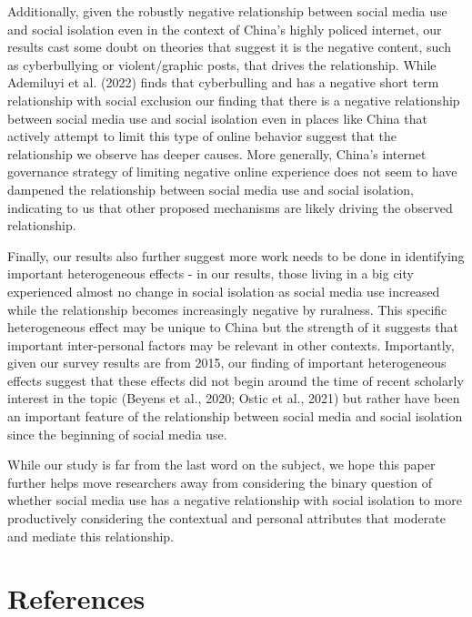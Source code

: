 \documentclass[]{interact}
\theoremstyle{plain}%
\theoremstyle{definition}
\theoremstyle{remark}
\begin{document}
Additionally, given the robustly negative relationship between social
media use and social isolation even in the context of China's highly
policed internet, our results cast some doubt on theories that suggest
it is the negative content, such as cyberbullying or violent/graphic
posts, that drives the relationship. While Ademiluyi et al. (2022) finds
that cyberbulling and has a negative short term relationship with social
exclusion our finding that there is a negative relationship between
social media use and social isolation even in places like China that
actively attempt to limit this type of online behavior suggest that the
relationship we observe has deeper causes. More generally, China's
internet governance strategy of limiting negative online experience does
not seem to have dampened the relationship between social media use and
social isolation, indicating to us that other proposed mechanisms are
likely driving the observed relationship.

Finally, our results also further suggest more work needs to be done in
identifying important heterogeneous effects - in our results, those
living in a big city experienced almost no change in social isolation as
social media use increased while the relationship becomes increasingly
negative by ruralness. This specific heterogeneous effect may be unique
to China but the strength of it suggests that important inter-personal
factors may be relevant in other contexts. Importantly, given our survey
results are from 2015, our finding of important heterogeneous effects
suggest that these effects did not begin around the time of recent
scholarly interest in the topic (Beyens et al., 2020; Ostic et al.,
2021) but rather have been an important feature of the relationship
between social media and social isolation since the beginning of social
media use.

While our study is far from the last word on the subject, we hope this
paper further helps move researchers away from considering the binary
question of whether social media use has a negative relationship with
social isolation to more productively considering the contextual and
personal attributes that moderate and mediate this relationship.

\newpage{}

\section{References}\label{references}
\end{document}
